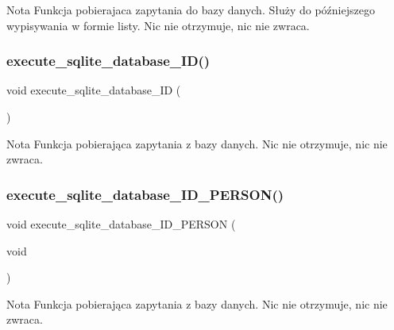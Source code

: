 \begin{DoxyCode}{0}
\end{DoxyCode}
 \begin{DoxyNote}{Nota}
Funkcja pobierajaca zapytania do bazy danych. Służy do późniejszego wypisywania w formie listy. Nic nie otrzymuje, nic nie zwraca. 
\end{DoxyNote}
\mbox{\label{client__management_8cpp_a955a231962a4bd5b3c17c3db0ff93612}} 
\subsubsection{execute\_sqlite\_database\_ID()}
{\footnotesize\ttfamily void execute\+\_\+sqlite\+\_\+database\+\_\+\+ID (\begin{DoxyParamCaption}{ }\end{DoxyParamCaption})}


\begin{DoxyCode}{0}
\end{DoxyCode}
 \begin{DoxyNote}{Nota}
Funkcja pobierająca zapytania z bazy danych. Nic nie otrzymuje, nic nie zwraca. 
\end{DoxyNote}
\mbox{\label{client__management_8cpp_a52e671a6e00226712f96fc23d3d3cd36}} 
\subsubsection{execute\_sqlite\_database\_ID\_PERSON()}
{\footnotesize\ttfamily void execute\+\_\+sqlite\+\_\+database\+\_\+\+I\+D\+\_\+\+P\+E\+R\+S\+ON (\begin{DoxyParamCaption}\item[{void}]{ }\end{DoxyParamCaption})}


\begin{DoxyCode}{0}
\end{DoxyCode}
 \begin{DoxyNote}{Nota}
Funkcja pobierająca zapytania z bazy danych. Nic nie otrzymuje, nic nie zwraca. 
\end{DoxyNote}
\mbox{\label{client__management_8cpp_a5bf1d946e7e8a8af96d0dff113880a1a}} 
